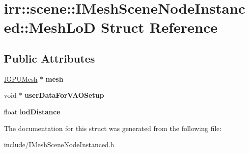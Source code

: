 \hypertarget{structirr_1_1scene_1_1IMeshSceneNodeInstanced_1_1MeshLoD}{}\section{irr\+:\+:scene\+:\+:I\+Mesh\+Scene\+Node\+Instanced\+:\+:Mesh\+LoD Struct Reference}
\label{structirr_1_1scene_1_1IMeshSceneNodeInstanced_1_1MeshLoD}
\subsection*{Public Attributes}
\begin{DoxyCompactItemize}
\item 
\hyperlink{classirr_1_1scene_1_1IMesh}{I\+G\+P\+U\+Mesh} $\ast$ {\bfseries mesh}\hypertarget{structirr_1_1scene_1_1IMeshSceneNodeInstanced_1_1MeshLoD_a8b7ec4e2478f843f44c041ce9f79e3ba}{}\label{structirr_1_1scene_1_1IMeshSceneNodeInstanced_1_1MeshLoD_a8b7ec4e2478f843f44c041ce9f79e3ba}

\item 
void $\ast$ {\bfseries user\+Data\+For\+V\+A\+O\+Setup}\hypertarget{structirr_1_1scene_1_1IMeshSceneNodeInstanced_1_1MeshLoD_ababdc7746e8420bb77216a25cdfd1dd3}{}\label{structirr_1_1scene_1_1IMeshSceneNodeInstanced_1_1MeshLoD_ababdc7746e8420bb77216a25cdfd1dd3}

\item 
float {\bfseries lod\+Distance}\hypertarget{structirr_1_1scene_1_1IMeshSceneNodeInstanced_1_1MeshLoD_a42cf168f7a65df322e9cd1e0f9cd529a}{}\label{structirr_1_1scene_1_1IMeshSceneNodeInstanced_1_1MeshLoD_a42cf168f7a65df322e9cd1e0f9cd529a}

\end{DoxyCompactItemize}


The documentation for this struct was generated from the following file\+:\begin{DoxyCompactItemize}
\item 
include/I\+Mesh\+Scene\+Node\+Instanced.\+h\end{DoxyCompactItemize}
